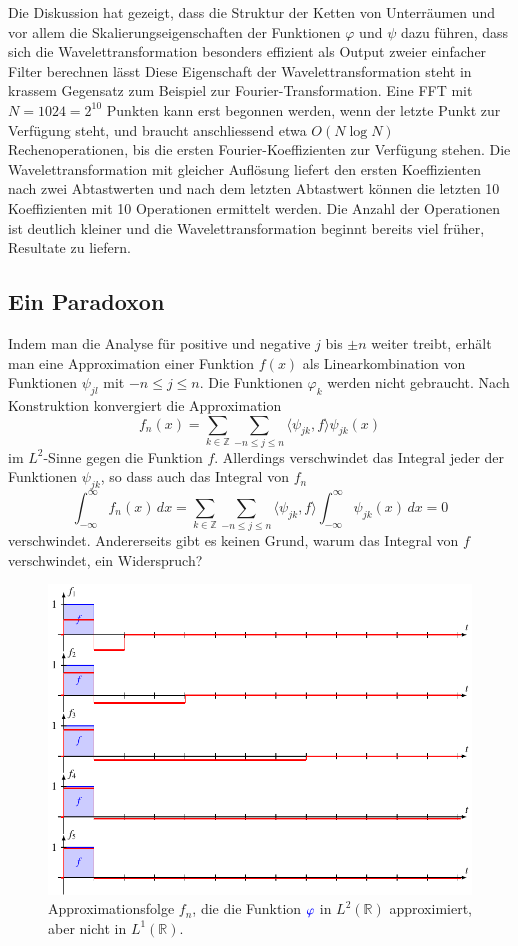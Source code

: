 Die Diskussion hat gezeigt, dass die Struktur der Ketten von Unterräumen
und vor allem die Skalierungseigenschaften der Funktionen $\varphi$ und $\psi$
dazu führen, dass sich die Wavelettransformation besonders effizient
als Output zweier einfacher Filter berechnen lässt
Diese Eigenschaft der Wavelettransformation steht in krassem Gegensatz
zum Beispiel zur Fourier-Transformation.
Eine FFT mit $N=1024=2^{10}$ Punkten kann erst begonnen werden, wenn der
letzte Punkt zur Verfügung steht, und braucht anschliessend etwa
$O(N\log N)$ Rechenoperationen, bis die ersten Fourier-Koeffizienten zur
Verfügung stehen.
Die Wavelettransformation mit gleicher Auflösung liefert den ersten
Koeffizienten nach zwei Abtastwerten und nach dem letzten Abtastwert
können die letzten 10
Koeffizienten mit 10 Operationen ermittelt werden.
Die Anzahl der Operationen ist deutlich kleiner und
die Wavelettransformation beginnt bereits viel früher, Resultate zu
liefern.

\subsection{Ein Paradoxon
\label{haar:paradoxon}}
Indem man die Analyse für positive und negative $j$ bis $\pm n$ weiter treibt,
erhält man
eine Approximation einer Funktion $f(x)$ als Linearkombination von
Funktionen $\psi_{jl}$ mit $-n\le j\le n$.
Die Funktionen $\varphi_k$ werden nicht gebraucht.
Nach Konstruktion konvergiert die Approximation
\[
f_n(x)
=
\sum_{k\in\mathbb Z}\sum_{-n\le j\le n} \langle\psi_{jk},f\rangle \psi_{jk}(x)
\]
im $L^2$-Sinne gegen die Funktion $f$.
Allerdings verschwindet das Integral jeder der Funktionen $\psi_{jk}$,
so dass auch das Integral von $f_n$
\[
\int_{-\infty}^\infty f_n(x)\,dx
=
\sum_{k\in\mathbb Z}\sum_{-n\le j\le n} \langle\psi_{jk},f\rangle
\int_{-\infty}^\infty \psi_{jk}(x)\,dx
=
0
\]
verschwindet.
Andererseits gibt es keinen Grund, warum das Integral von $f$ verschwindet,
ein Widerspruch?

\begin{figure}
\centering
\includegraphics{chapters/3-haar/images/paradox.pdf}
\caption{Approximationsfolge $f_n$, die die Funktion ${\color{blue}\varphi}$
in $L^2(\mathbb R)$ approximiert, aber nicht in $L^1(\mathbb R)$.
\label{haar:fig:paradox}}
\end{figure}

